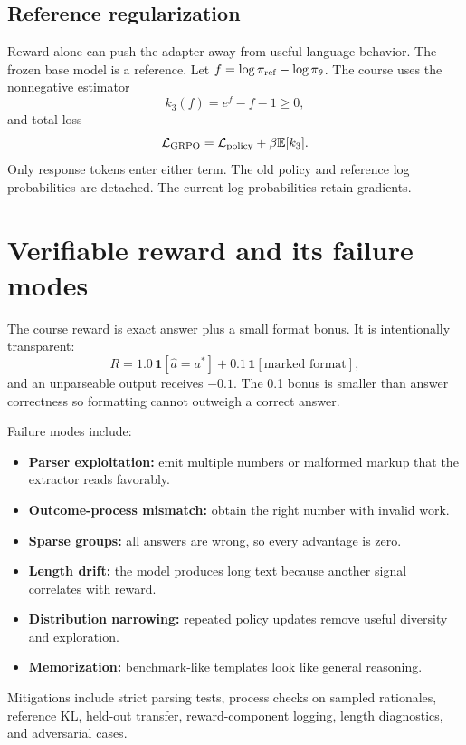 \documentclass[11pt]{article}
\newcommand{\E}{\mathbb{E}}
\begin{document}
\subsection{Reference regularization}
Reward alone can push the adapter away from useful language behavior. The frozen
base model is a reference. Let $f=\log\pi_{\rm ref}-\log\pi_\theta$. The course
uses the nonnegative estimator
\[
k_3(f)=e^f-f-1\geq0,
\]
and total loss
\[
\mathcal L_{\rm GRPO}=\mathcal L_{\rm policy}+\beta\E[k_3].
\]
Only response tokens enter either term. The old policy and reference log
probabilities are detached. The current log probabilities retain gradients.

\section{Verifiable reward and its failure modes}
The course reward is exact answer plus a small format bonus. It is intentionally
transparent:
\[
R=1.0\,\mathbf1[\hat a=a^*]+0.1\,\mathbf1[\text{marked format}],
\]
and an unparseable output receives $-0.1$. The 0.1 bonus is smaller than answer
correctness so formatting cannot outweigh a correct answer.

Failure modes include:
\begin{itemize}
\item \textbf{Parser exploitation:} emit multiple numbers or malformed markup that
the extractor reads favorably.
\item \textbf{Outcome-process mismatch:} obtain the right number with invalid work.
\item \textbf{Sparse groups:} all answers are wrong, so every advantage is zero.
\item \textbf{Length drift:} the model produces long text because another signal
correlates with reward.
\item \textbf{Distribution narrowing:} repeated policy updates remove useful
diversity and exploration.
\item \textbf{Memorization:} benchmark-like templates look like general reasoning.
\end{itemize}
Mitigations include strict parsing tests, process checks on sampled rationales,
reference KL, held-out transfer, reward-component logging, length diagnostics,
and adversarial cases.
\end{document}
